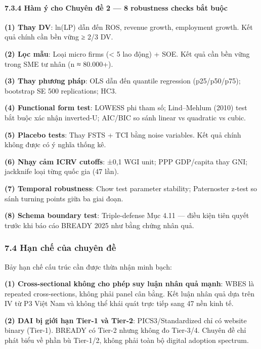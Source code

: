 \documentclass[12pt,a4paper]{article}
\begin{document}
\hypertarget{734-huxe0m-uxfd-cho-chuyuxean-ux111ux1ec1-2--8-robustness-checks-bux1eaft-buux1ed9c}{%
\paragraph{7.3.4 Hàm ý cho Chuyên đề 2 --- 8 robustness checks bắt
buộc}\label{734-huxe0m-uxfd-cho-chuyuxean-ux111ux1ec1-2--8-robustness-checks-bux1eaft-buux1ed9c}}

\textbf{(1) Thay DV}: ln(LP) dẫn đến ROS, revenue growth, employment
growth. Kết quả chính cần bền vững ≥ 2/3 DV.

\textbf{(2) Lọc mẫu}: Loại micro firms (\textless{} 5 lao động) + SOE.
Kết quả cần bền vững trong SME tư nhân (n ≈ 80.000+).

\textbf{(3) Thay phương pháp}: OLS dẫn đến quantile regression
(p25/p50/p75); bootstrap SE 500 replications; HC3.

\textbf{(4) Functional form test}: LOWESS phi tham số; Lind--Mehlum
(2010) test bắt buộc xác nhận inverted-U; AIC/BIC so sánh linear vs
quadratic vs cubic.

\textbf{(5) Placebo tests}: Thay FSTS + TCI bằng noise variables. Kết
quả chính không được có ý nghĩa thống kê.

\textbf{(6) Nhạy cảm ICRV cutoffs}: ±0,1 WGI unit; PPP GDP/capita thay
GNI; jackknife loại từng quốc gia (47 lần).

\textbf{(7) Temporal robustness}: Chow test parameter stability;
Paternoster z-test so sánh turning points giữa ba giai đoạn.

\textbf{(8) Schema boundary test}: Triple-defense Mục 4.11 --- điều kiện
tiên quyết trước khi báo cáo BREADY 2025 như bằng chứng nhân quả.

\hypertarget{74-hux1ea1n-chux1ebf-cux1ee7a-chuyuxean-ux111ux1ec1}{%
\subsubsection{7.4 Hạn chế của chuyên
đề}\label{74-hux1ea1n-chux1ebf-cux1ee7a-chuyuxean-ux111ux1ec1}}

Bảy hạn chế cấu trúc cần được thừa nhận minh bạch:

\textbf{(1) Cross-sectional không cho phép suy luận nhân quả mạnh}: WBES
là repeated cross-sections, không phải panel cân bằng. Kết luận nhân quả
dựa trên IV từ P3 Việt Nam và không thể khái quát trực tiếp sang 47 nền
kinh tế.

\textbf{(2) DAI bị giới hạn Tier-1 và Tier-2}: PICS3/Standardized chỉ có
website binary (Tier-1). BREADY có Tier-2 nhưng không đo Tier-3/4.
Chuyên đề chỉ phát biểu về phần bù Tier-1/2, không phải toàn bộ digital
adoption spectrum.
\end{document}

